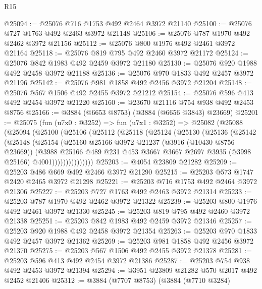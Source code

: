 \begin{lexlean}{R15}
\begin{coremodule}
@25094 := @25076 @716 @1753 @492 @2464 @3972 @21140
@25100 := @25076 @727 @1763 @492 @2463 @3972 @21148
@25106 := @25076 @787 @1970 @492 @2462 @3972 @21156
@25112 := @25076 @800 @1976 @492 @2461 @3972 @21164
@25118 := @25076 @819 @795 @492 @2460 @3972 @21172
@25124 := @25076 @842 @1983 @492 @2459 @3972 @21180
@25130 := @25076 @920 @1988 @492 @2458 @3972 @21188
@25136 := @25076 @970 @1833 @492 @2457 @3972 @21196
@25142 := @25076 @981 @1858 @492 @2456 @3972 @21204
@25148 := @25076 @567 @1506 @492 @2455 @3972 @21212
@25154 := @25076 @596 @413 @492 @2454 @3972 @21220
@25160 := @23670 @21116 @754 @938 @492 @2453 @8756
@25166 := @3884 (@6653 @8753) (@3884 (@6656 @3843) @23669)
@25201 := @25075
    (fun (u7x0 : @3252) =>
    fun (u7x1 : @3252) =>
    @25082
      (@25088
        (@25094
          (@25100
            (@25106
              (@25112
                (@25118
                  (@25124
                    (@25130
                      (@25136
                        (@25142
                          (@25148
                            (@25154
                              (@25160
                                @25166
                                @3972
                                @21237
                                (@3916 (@10430 @8756 @23669))
                                (@3988
                                  @25166
                                  @489
                                  @231
                                  @453
                                  @3667
                                  @3667
                                  @2697
                                  @3935
                                  (@3998 @25166)
                                  @4001)))))))))))))))
@25203 := @4054 @23809 @21282
@25209 := @25203 @486 @669 @492 @2466 @3972 @21290
@25215 := @25203 @573 @1747 @2420 @2465 @3972 @21298
@25221 := @25203 @716 @1753 @492 @2464 @3972 @21306
@25227 := @25203 @727 @1763 @492 @2463 @3972 @21314
@25233 := @25203 @787 @1970 @492 @2462 @3972 @21322
@25239 := @25203 @800 @1976 @492 @2461 @3972 @21330
@25245 := @25203 @819 @795 @492 @2460 @3972 @21338
@25251 := @25203 @842 @1983 @492 @2459 @3972 @21346
@25257 := @25203 @920 @1988 @492 @2458 @3972 @21354
@25263 := @25203 @970 @1833 @492 @2457 @3972 @21362
@25269 := @25203 @981 @1858 @492 @2456 @3972 @21370
@25275 := @25203 @567 @1506 @492 @2455 @3972 @21378
@25281 := @25203 @596 @413 @492 @2454 @3972 @21386
@25287 := @25203 @754 @938 @492 @2453 @3972 @21394
@25294 := @3951 @23809 @21282 @570 @2017 @492 @2452 @21406
@25312 := @3884
    (@7707 @8753)
    (@3884
      (@7710 @3284)

\end{coremodule}
\end{lexlean}
